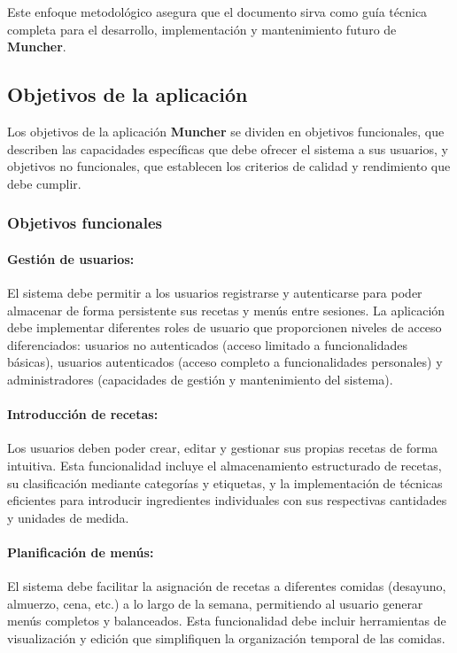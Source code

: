 Este enfoque metodológico asegura que el documento sirva como guía técnica completa para el desarrollo, implementación y mantenimiento futuro de \textbf{Muncher}.

\subsection*{Objetivos de la aplicación}

Los objetivos de la aplicación \textbf{Muncher} se dividen en objetivos funcionales, que describen las capacidades específicas que debe ofrecer el sistema a sus usuarios, y objetivos no funcionales, que establecen los criterios de calidad y rendimiento que debe cumplir.

\subsubsection*{Objetivos funcionales}

\paragraph*{Gestión de usuarios:}
El sistema debe permitir a los usuarios registrarse y autenticarse para poder almacenar de forma persistente sus recetas y menús entre sesiones. La aplicación debe implementar diferentes roles de usuario que proporcionen niveles de acceso diferenciados: usuarios no autenticados (acceso limitado a funcionalidades básicas), usuarios autenticados (acceso completo a funcionalidades personales) y administradores (capacidades de gestión y mantenimiento del sistema).

\paragraph*{Introducción de recetas:}
Los usuarios deben poder crear, editar y gestionar sus propias recetas de forma intuitiva. Esta funcionalidad incluye el almacenamiento estructurado de recetas, su clasificación mediante categorías y etiquetas, y la implementación de técnicas eficientes para introducir ingredientes individuales con sus respectivas cantidades y unidades de medida.

\paragraph*{Planificación de menús:}
El sistema debe facilitar la asignación de recetas a diferentes comidas (desayuno, almuerzo, cena, etc.) a lo largo de la semana, permitiendo al usuario generar menús completos y balanceados. Esta funcionalidad debe incluir herramientas de visualización y edición que simplifiquen la organización temporal de las comidas.

